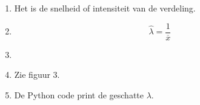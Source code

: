 \documentclass{article}
\begin{document}
\begin{enumerate}
\begin{enumerate}[1.]
            \item
                Het is de snelheid of intensiteit van de verdeling.

            \item
                $$\widehat{\lambda}=\frac1{\overline{x}}$$

            \item
                \inputminted{python}{expo.py}

            \item
                Zie figuur 3.
                

            \item De Python code print de geschatte $\lambda$.

        \end{enumerate}

\end{enumerate}
\end{document}
